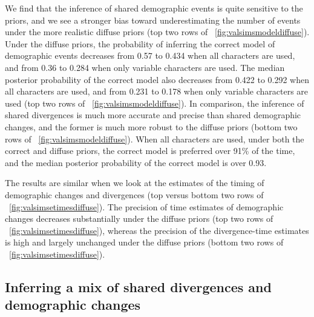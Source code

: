 We find that the inference of shared demographic events is quite sensitive to
the priors, and we see a stronger bias toward underestimating the number of
events under the more realistic diffuse priors
(top two rows of \fig{}~\ref{fig:valsimsmodeldiffuse}).
Under the diffuse priors, the probability of inferring the correct model of
demographic events decreases from 0.57 to 0.434 when all characters are used,
and from 0.36 to 0.284 when only variable characters are used.
The median posterior probability of the correct model also decreases from
0.422 to 0.292 when all characters are used,
and from 0.231 to 0.178 when only variable characters are used
(top two rows of \fig{}~\ref{fig:valsimsmodeldiffuse}).
In comparison, the inference of shared divergences is much more
accurate and precise than shared demographic changes, and
the former is much more robust to the diffuse priors
(bottom two rows of \fig{}~\ref{fig:valsimsmodeldiffuse}).
When all characters are used, under both the correct and diffuse
priors, the correct model is preferred over 91\% of the time,
and the median posterior probability of the correct model is over
0.93.

\ifembed{

}{}

The results are similar when we look at the estimates of the timing of
demographic changes and divergences
(top versus bottom two rows of \fig{}~\ref{fig:valsimsetimesdiffuse}).
The precision of time estimates of demographic changes decreases
substantially under the diffuse priors
(top two rows of \fig{}~\ref{fig:valsimsetimesdiffuse}),
whereas the precision of the divergence-time estimates
is high and largely unchanged under the diffuse priors
(bottom two rows of \fig{}~\ref{fig:valsimsetimesdiffuse}).

\ifembed{

}{}


\subsection{Inferring a mix of shared divergences and demographic changes}

